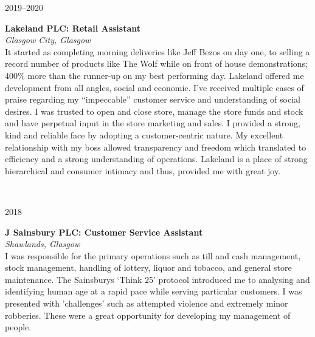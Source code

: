 \documentclass[11pt, english]{article}
\begin{document}
{\begin{minipage}[t]{.15\linewidth}
        \hfill 
        \textsc{2019--2020}
\end{minipage}
\hfill\vline\hfill
\begin{minipage}[t]{.80\linewidth}
        \textbf{Lakeland PLC: Retail Assistant}\\
        \textit{Glasgow City, Glasgow}\\ 
	It started as completing morning deliveries like Jeff Bezos on day one, to selling a record number of products like The Wolf while on front of house demonstrations; 400\% more than the runner-up on my best performing day. Lakeland offered me development from all angles, social and economic. I’ve received multiple cases of praise regarding my ``impeccable'' customer service and understanding of social desires. I was trusted to open and close store, manage the store funds and stock and have perpetual input in the store marketing and sales. I provided a strong, kind and reliable face by adopting a customer-centric nature. My excellent relationship with my boss allowed transparency and freedom which translated to efficiency and a strong understanding of operations. Lakeland is a place of strong hierarchical and consumer intimacy and thus, provided me with great joy.
\end{minipage}\\
\vspace{0.25cm}

\begin{minipage}[t]{.15\linewidth}
        \hfill                
        \textsc{2018}
\end{minipage}    
\hfill\vline\hfill                
\begin{minipage}[t]{.80\linewidth}                
	\textbf{J Sainsbury PLC: Customer Service Assistant}\\
        \textit{Shawlands, Glasgow}\\ 
	I was responsible for the primary operations such as till and cash management, stock management, handling of lottery, liquor and tobacco, and general store maintenance. The Sainsburys `Think 25' protocol introduced me to analysing and identifying human age at a rapid pace while serving particular customers. I was presented with 'challenges' such as attempted violence and extremely minor robberies. These were a great opportunity for developing my management of people.
\end{minipage}\\
\vspace{0.25cm}

}
\end{document}
